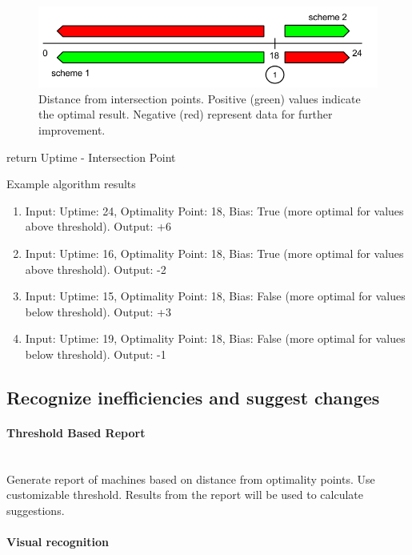 \documentclass[]{final_report}
\newcommand{\myparagraph}[1]{\paragraph{#1}\mbox{}\\}
\begin{document}
\begin{figure}[H]
       \includegraphics[width=\linewidth]{figures/distance}
      \caption{Distance from intersection points. Positive (green) values indicate the optimal result. Negative (red) represent data for further improvement.}
        \label{fig:distance}
\end{figure}

\begin{algorithm}[H]
 \label{alg:distance_from_optimality}
   {
        return Uptime - Intersection Point
  } 
\caption{Uptime Based Distance From Intersection Points}
\end{algorithm}

Example algorithm results
\begin{enumerate}
\item Input: Uptime: 24, Optimality Point: 18, Bias: True (more optimal for values above threshold). Output: +6
\item Input: Uptime: 16, Optimality Point: 18, Bias: True (more optimal for values above threshold). Output: -2
\item Input: Uptime: 15, Optimality Point: 18, Bias: False (more optimal for values below threshold). Output: +3
\item Input: Uptime: 19, Optimality Point: 18, Bias: False (more optimal for values below threshold). Output: -1
\end{enumerate}

\subsection{Recognize inefficiencies and suggest changes}

\myparagraph{Threshold Based Report}

Generate report of machines based on distance from optimality points. Use customizable threshold. 
Results from the report will be used to calculate suggestions.

\myparagraph{Visual recognition}
\end{document}
